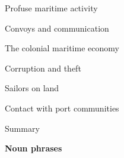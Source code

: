 \begin{listWWNumvileveli}
\begin{listWWNumvilevelii}
\setcounter{listWWNumvileveliii}{0}
\begin{listWWNumvileveliii}
\item 
\begin{styleListParagraph}
Profuse maritime activity
\end{styleListParagraph}

\item 
\begin{styleListParagraph}
Convoys and communication
\end{styleListParagraph}

\item 
\begin{styleListParagraph}
The colonial maritime economy 
\end{styleListParagraph}

\item 
\begin{styleListParagraph}
Corruption and theft 
\end{styleListParagraph}

\item 
\begin{styleListParagraph}
Sailors on land
\end{styleListParagraph}

\item 
\begin{styleListParagraph}
Contact with port communities 
\end{styleListParagraph}

\end{listWWNumvileveliii}
\item 
\begin{styleListParagraph}
Summary 
\end{styleListParagraph}

\end{listWWNumvilevelii}
\end{listWWNumvileveli}
\setcounter{listWWNumiileveli}{0}
\begin{listWWNumiileveli}
\item 
\begin{styleListParagraph}
\textbf{Noun phrases }
\end{styleListParagraph}

\end{listWWNumiileveli}
\setcounter{listWWNumviileveli}{4}
